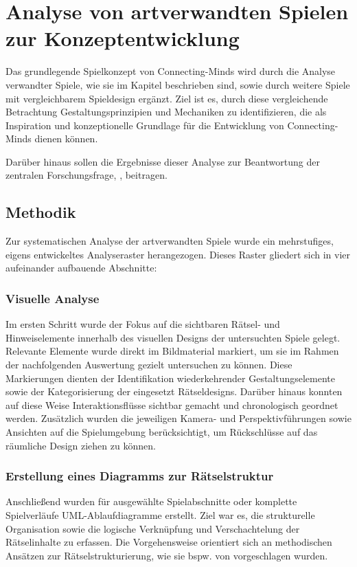 \chapter{Analyse von artverwandten Spielen zur Konzeptentwicklung}\label{sec:analysis}

Das grundlegende Spielkonzept von Connecting-Minds wird durch die Analyse verwandter Spiele, wie sie im Kapitel \emph{} beschrieben sind, sowie durch weitere Spiele mit vergleichbarem Spieldesign ergänzt. Ziel ist es, durch diese vergleichende Betrachtung Gestaltungsprinzipien und Mechaniken zu identifizieren, die als Inspiration und konzeptionelle Grundlage für die Entwicklung von Connecting-Minds dienen können.

Darüber hinaus sollen die Ergebnisse dieser Analyse zur Beantwortung der zentralen Forschungsfrage, \emph{}, beitragen.

\section{Methodik}
Zur systematischen Analyse der artverwandten Spiele wurde ein mehrstufiges, eigens entwickeltes Analyseraster herangezogen. Dieses Raster gliedert sich in vier aufeinander aufbauende Abschnitte:

\subsection{Visuelle Analyse}
Im ersten Schritt wurde der Fokus auf die sichtbaren Rätsel- und Hinweiselemente innerhalb des visuellen Designs der untersuchten Spiele gelegt. Relevante Elemente wurde direkt im Bildmaterial markiert, um sie im Rahmen der nachfolgenden Auswertung gezielt untersuchen zu können. Diese Markierungen dienten der Identifikation wiederkehrender Gestaltungselemente sowie der Kategorisierung der eingesetzt Rätseldesigns. Darüber hinaus konnten auf diese Weise Interaktionsflüsse sichtbar gemacht und chronologisch geordnet werden. Zusätzlich wurden die jeweiligen Kamera- und Perspektivführungen sowie Ansichten auf die Spielumgebung berücksichtigt, um Rückschlüsse auf das räumliche Design ziehen zu können.

\subsection{Erstellung eines Diagramms zur Rätselstruktur}
Anschließend wurden für ausgewählte Spielabschnitte oder komplette Spielverläufe UML-Ablaufdiagramme erstellt. Ziel war es, die strukturelle Organisation sowie die logische Verknüpfung und Verschachtelung der Rätselinhalte zu erfassen. Die Vorgehensweise orientiert sich an methodischen Ansätzen zur Rätselstrukturierung, wie sie bspw. von \cite{schafer_grim_1996} vorgeschlagen wurden.

